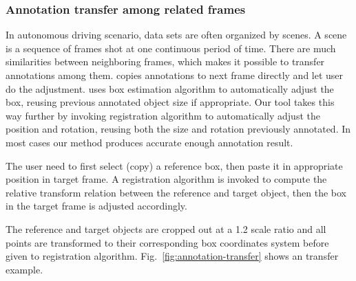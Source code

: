 \documentclass[letterpaper, 10 pt, conference]{ieeeconf}  %
\begin{document}
\subsubsection{Annotation transfer among related frames}
\label{semi-auto-anno}
In autonomous driving scenario, data sets are often organized by scenes\cite{Caesar2019nuScenesAM,Patil2019TheHD,lyft2019}. A scene is a sequence of frames shot at one continuous period of time. There are much similarities between neighboring frames, which makes it possible to transfer annotations among them. \cite{Zimmer20193DBA} copies annotations to next frame directly and let user do the adjustment.\cite{Wang2019LATTEAL} uses box estimation algorithm to automatically adjust the box, reusing previous annotated object size if appropriate. Our tool takes this way further by invoking registration algorithm \cite{Yang2016GoICPAG} to automatically adjust the position and rotation, reusing both the size and rotation previously annotated. In most cases our method produces  accurate enough annotation result.

The user need to first select (copy) a reference box, then paste it in appropriate position in target frame. A registration algorithm is invoked to compute the relative transform relation between the reference and target object, then the box in the target frame is adjusted accordingly.

The reference and target objects are cropped out at a 1.2 scale ratio and all points are transformed to their corresponding box coordinates system before given to registration algorithm. Fig.~\ref{fig:annotation-transfer} shows an transfer example.
\end{document}
